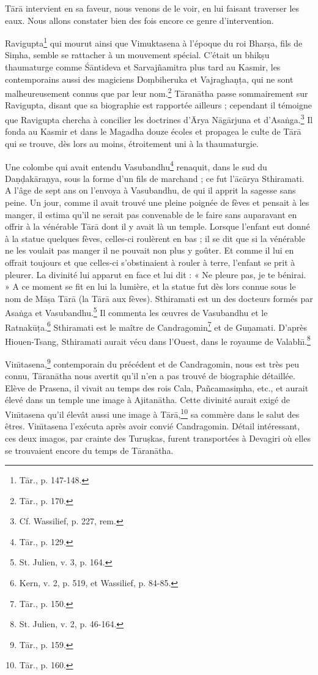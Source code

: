 \documentclass[a4paper, 11pt, oneside, french]{article}
\begin{document}
T\={a}r\={a} intervient en sa faveur, nous venons de le voir, en lui faisant traverser les eaux. Nous allons constater bien des fois encore ce genre d'intervention.

Ravigupta\footnote{T\={a}r., p. 147-148.} qui mourut ainsi que Vimuktasena à l'époque du roi Bhar\d{s}a, fils de Si\d{m}ha, semble se rattacher à un mouvement spécial. C'était un bhik\d{s}u thaumaturge comme \'{S}\={a}ntideva et Sarvaj\~{n}amitra plus tard au Kasmir, les contemporains aussi des magiciens Do\d{m}biheruka et Vajragha\d{n}\d{t}a, qui ne sont malheureusement connus que par leur nom.\footnote{T\={a}r., p. 170.} T\={a}ran\={a}tha passe sommairement sur Ravigupta, disant que sa biographie est rapportée ailleurs ; cependant il témoigne que Ravigupta chercha à concilier les doctrines d'\={A}rya N\={a}g\={a}rjuna et d'Asa\.{n}ga.\footnote{Cf. Wassilief, p. 227, rem.} Il fonda au Kasmir et dans le Magadha douze écoles et propagea le culte de T\={a}r\={a} qui se trouve, dès lors au moins, étroitement uni à la thaumaturgie.

Une colombe qui avait entendu Vasubandhu\footnote{T\={a}r., p. 129.} renaquit, dans le sud du Da\d{n}\d{d}ak\={a}ra\d{n}ya, sous la forme d'un fils de marchand ; ce fut l'\={a}c\={a}rya Sthiramati. A l'âge de sept ans on l'envoya à Vasubandhu, de qui il apprit la sagesse sans peine. Un jour, comme il avait trouvé une pleine poignée de fèves et pensait à les manger, il estima qu'il ne serait pas convenable de le faire sans auparavant en offrir à la vénérable T\={a}r\={a} dont il y avait là un temple. Lorsque l'enfant eut donné à la statue quelques fèves, celles-ci roulèrent en bas ; il se dit que si la vénérable ne les voulait pas manger il ne pouvait non plus y goûter. Et comme il lui en offrait toujours et que celles-ci s'obstinaient à rouler à terre, l'enfant se prit à pleurer. La divinité lui apparut en face et lui dit : « Ne pleure pas, je te bénirai. » A ce moment se fit en lui la lumière, et la statue fut dès lors connue sous le nom de M\={a}\d{s}a T\={a}r\={a} (la T\={a}r\={a} aux fèves). Sthiramati est un des docteurs formés par Asa\.{n}ga et Vasubandhu.\footnote{St. Julien, v. 3, p. 164.} Il commenta les œuvres de Vasubandhu et le Ratnak\={u}\d{t}a.\footnote{Kern, v. 2, p. 519, et Wassilief, p. 84-85.} Sthiramati est le maître de Candragomin\footnote{T\={a}r., p. 150.} et de Gu\d{n}amati. D'après Hiouen-Tsang, Sthiramati aurait vécu dans l'Ouest, dans le royaume de Valabh\={\i}.\footnote{St. Julien, v. 2, p. 46-164.}

Vin\={\i}tasena,\footnote{T\={a}r., p. 159.} contemporain du précédent et de Candragomin, nous est très peu connu, T\={a}ran\={a}tha nous avertit qu'il n'en a pas trouvé de biographie détaillée. Elève de Prasena, il vivait au temps des rois Cala, Pa\~{n}camasi\d{m}ha, etc., et aurait élevé dans un temple une image à Ajitan\={a}tha. Cette divinité aurait exigé de Vin\={\i}tasena qu'il élevât aussi une image à T\={a}r\={a},\footnote{T\={a}r., p. 160.} sa commère dans le salut des êtres. Vin\={\i}tasena l'exécuta après avoir convié Candragomin. Détail intéressant, ces deux imagos, par crainte des Turu\d{s}kas, furent transportées à Devagiri où elles se trouvaient encore du temps de T\={a}ran\={a}tha.
\end{document}
